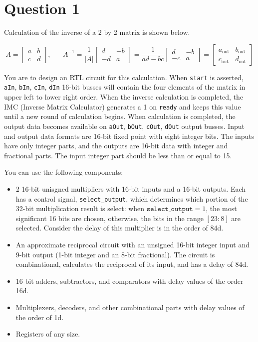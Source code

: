 \documentclass[../main.tex]{subfiles}
\begin{document}
\section{Question 1} \label{sec:q1}

Calculation of the inverse of a 2 by 2 matrix is shown below.

$$
A =
\begin{bmatrix}
    a & b \\
    c & d
\end{bmatrix}
, \hspace{20pt} A^{-1} = \frac{1}{|A|}
\begin{bmatrix}
    d & -b \\
    -d & a
\end{bmatrix}
= \frac{1}{ad - bc}
\begin{bmatrix}
    d & -b \\
    -c & a
\end{bmatrix}
=
\begin{bmatrix}
    a_\text{out} & b_\text{out} \\
    c_\text{out} & d_\text{out}
\end{bmatrix}
$$

You are to design an RTL circuit for this calculation. When \texttt{start} is asserted, \texttt{aIn}, \texttt{bIn}, \texttt{cIn}, \texttt{dIn} 16-bit busses will contain the four elements of the matrix in upper left to lower right order. When the inverse calculation is completed, the IMC (Inverse Matrix Calculator) generates a 1 on \texttt{ready} and keeps this value until a new round of calculation begins. When calculation is completed, the output data becomes available on \texttt{aOut}, \texttt{bOut}, \texttt{cOut}, \texttt{dOut} output busses. Input and output data formats are 16-bit fixed point with eight integer bits. The inputs have only integer parts, and the outputs are 16-bit data with integer and fractional parts. The input integer part should be less than or equal to 15.

You can use the following components:

\begin{itemize}
    \item 2 16-bit unisgned multipliers with 16-bit inputs and a 16-bit outputs. Each has a control signal, \texttt{select\_output}, which determines which portion of the 32-bit multiplication result is select: when $\texttt{select\_output} = 1$, the most significant 16 bits are chosen, otherwise, the bits in the range $[23:8]$ are selected. Consider the delay of this multiplier is in the order of 84d.
    \item An approximate reciprocal circuit with an unsigned 16-bit integer input and 9-bit output (1-bit integer and an 8-bit fractional). The circuit is combinational, calculates the reciprocal of its input, and has a delay of 84d.
    \item 16-bit adders, subtractors, and comparators with delay values of the order 16d.
    \item Multiplexers, decoders, and other combinational parts with delay values of the order of 1d.
    \item Registers of any size.
\end{itemize}
\end{document}
